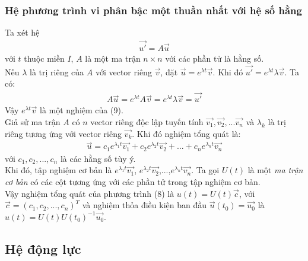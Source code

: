 \subsubsection{Hệ phương trình vi phân bậc một thuần nhất với hệ số hằng}
Ta xét hệ
\begin{align}
    \Vec{u'} = A\Vec{u}
\end{align}
với $t$ thuộc miền $I$, $A$ là một ma trận $n\times n$ với các phần tử là hằng số.\\
Nếu $\lambda$ là trị riêng của $A$ với vector riêng $\Vec{v}$, đặt $\Vec{u} = e^{\lambda t}\Vec{v}$. Khi đó $\Vec{u'} = e^{\lambda t}\lambda\Vec{v}$. Ta có:
\begin{align}
    A\Vec{u} = e^{\lambda t}A\Vec{v} = e^{\lambda t}\lambda\Vec{v} = \Vec{u'}
\end{align}
Vậy $e^{\lambda t}\Vec{v}$ là một nghiệm của (9).\\
Giả sử ma trận $A$ có $n$ vector riêng độc lập tuyến tính $\Vec{v_1}, \Vec{v_2},...\Vec{v_n}$ và $\lambda_k$ là trị riêng tương ứng với vector riêng $\Vec{v_k}$. Khi đó nghiệm tổng quát là:
\begin{align}
    \Vec{u} = c_1e^{\lambda_1 t}\Vec{v_1} + c_2e^{\lambda_2 t}\Vec{v_2} + ... + c_ne^{\lambda_n t}\Vec{v_n}
\end{align}
với $c_1, c_2,..., c_n$ là các hằng số tùy ý.\\
Khi đó, tập nghiệm cơ bản là $e^{\lambda_1 t}\Vec{v_1}$, $e^{\lambda_2 t}\Vec{v_2}$,...,$e^{\lambda_n t}\Vec{v_n}$. Ta gọi $U(t)$ là một \textit{ma trận cơ bản} có các cột tương ứng với các phần tử trong tập nghiệm cơ bản.\\
Vậy nghiệm tổng quát của phương trình (8) là $u(t) = U(t)\Vec{c}$, với $\Vec{c} = (c_1,c_2,...,c_n)^T$ và nghiệm thỏa điều kiện ban đầu $\Vec{u}(t_0) = \Vec{u_0}$ là $u(t) = U(t)U(t_0)^{-1}\Vec{u_0}$.
\subsection{Hệ động lực}
